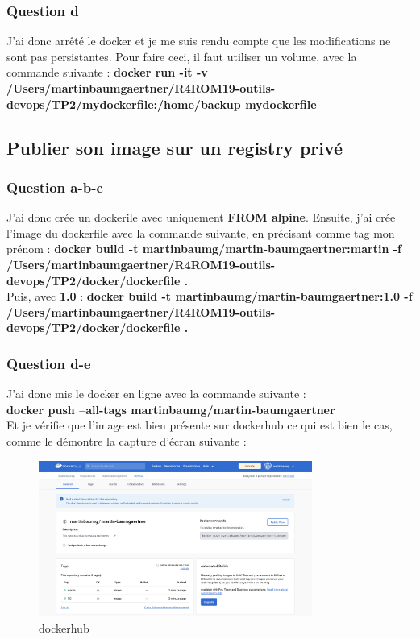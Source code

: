 \documentclass[12pt, a4paper]{article}
\begin{document}
\subsubsection{Question d}
J'ai donc arrêté le docker et je me suis rendu compte que les modifications
ne sont pas persistantes. Pour faire ceci, il faut utiliser un volume, avec la commande
suivante : \textbf{docker run -it -v /Users/martinbaumgaertner/R4ROM19-outils-devops/TP2/mydockerfile:/home/backup mydockerfile}
\newpage
\subsection{Publier son image sur un registry privé}
\subsubsection{Question a-b-c}
J'ai donc crée un dockerile avec uniquement \textbf{FROM alpine}. Ensuite, j'ai crée
l'image du dockerfile avec la commande suivante, en précisant comme tag mon 
prénom :
\textbf{docker build -t martinbaumg/martin-baumgaertner:martin -f /Users/martinbaumgaertner/R4ROM19-outils-devops/TP2/docker/dockerfile .}\\

Puis, avec \textbf{1.0} : 
\textbf{docker build -t martinbaumg/martin-baumgaertner:1.0 -f /Users/martinbaumgaertner/R4ROM19-outils-devops/TP2/docker/dockerfile .}

\subsubsection{Question d-e}
J'ai donc mis le docker en ligne avec la commande suivante :\\
\textbf{docker push --all-tags martinbaumg/martin-baumgaertner}\\

Et je vérifie que l'image est bien présente sur dockerhub ce qui est bien le cas,
comme le démontre la capture d'écran suivante :

\begin{figure}[h]
    \centering
    \includegraphics[width=0.8\textwidth]{img/docker-hub.png}
    \caption{dockerhub}
    \label{fig:docker}
\end{figure}
\end{document}
